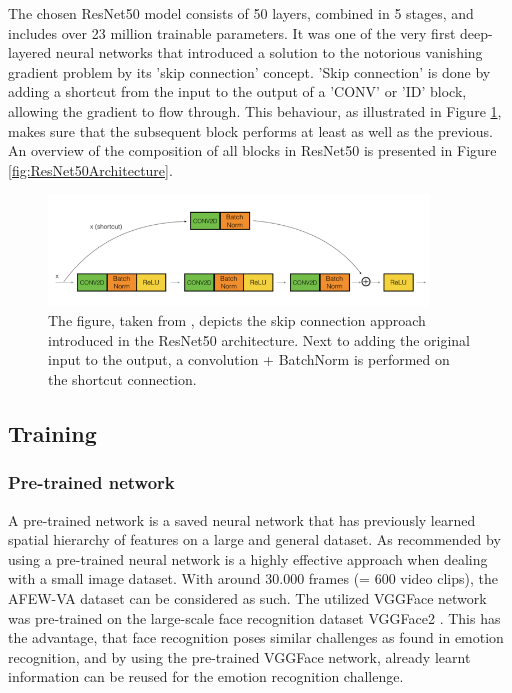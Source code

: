 \noindent The chosen ResNet50 \citep{He:2015:DeepResidualLearningForImageRecognition} model consists of 50 layers, combined in 5 stages, and includes over 23 million trainable parameters. It was one of the very first deep-layered neural networks that introduced a solution to the notorious vanishing gradient problem by its 'skip connection' concept.
\newline\newline
'Skip connection' is done by adding a shortcut from the input to the output of a 'CONV' or 'ID' block, allowing the gradient to flow through. This behaviour, as illustrated in Figure \ref{fig:ResNet50ConvBlock}, makes sure that the subsequent block performs at least as well as the previous. An overview of the composition of all blocks in ResNet50 is presented in Figure \ref{fig:ResNet50Architecture}. 

\begin{figure}[H]
  \begin{center}
  \includegraphics[angle=0, width=0.9\textwidth]{Figures/ResNet50_ConvBlock.png}
  \caption[ResNet50 skip connection]{The figure, taken from \citep{Dwivedi:2019:ResNetInKeras}, depicts the skip connection approach introduced in the ResNet50 \citep{He:2015:DeepResidualLearningForImageRecognition} architecture. Next to adding the original input to the output, a convolution + BatchNorm is performed on the shortcut connection.}
  \label{fig:ResNet50ConvBlock}
  \end{center}
\end{figure}


\subsection{Training} \label{sec:Training&Regularization}
\subsubsection{Pre-trained network}
A pre-trained network is a saved neural network that has previously learned spatial hierarchy of features on a large and general dataset. As recommended by \citet{Chollet:2017:DeepLearningPython} using a pre-trained neural network is a highly effective approach when dealing with a small image dataset. With around 30.000 frames (= 600 video clips), the AFEW-VA dataset \citep{Kossaifi:2017:AFEW-VADatabase} can be considered as such. The utilized VGGFace network was pre-trained on the large-scale face recognition dataset VGGFace2 \citep{Cao:2018:VGGFace2}. This has the advantage, that face recognition poses similar challenges as found in emotion recognition, and by using the pre-trained VGGFace network, already learnt information can be reused for the emotion recognition challenge.

